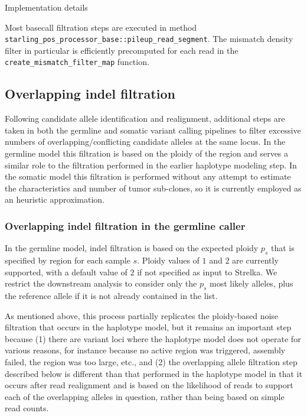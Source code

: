 \documentclass{article}
\newenvironment{raggedParagraph}[1]
{
    \begin{paragraph} {#1}
        \raggedright
    }
    {
    \end{paragraph}
}
\begin{document}
\begin{raggedParagraph}{Implementation details}

Most basecall filtration steps are executed in method \verb|starling_pos_processor_base::pileup_read_segment|. The mismatch density filter in particular is efficiently precomputed for each read in the \verb|create_mismatch_filter_map| function.

\end{raggedParagraph}

\fi %

\subsection{Overlapping indel filtration}

Following candidate allele identification and realignment, additional steps are taken in both the germline and somatic variant calling pipelines to filter excessive numbers of overlapping/conflicting candidate alleles at the same locus. In the germline model this filtration is based on the ploidy of the region and serves a similar role to the filtration performed in the earlier haplotype modeling step. In the somatic model this filtration is performed without any attempt to estimate the characteristics and number of tumor sub-clones, so it is currently employed as an heuristic approximation.

\subsubsection{Overlapping indel filtration in the germline caller}
In the germline model, indel filtration is based on the expected ploidy $p_s$ that is specified by region for each sample $s$. Ploidy values of $1$ and $2$ are currently supported, with a default value of $2$ if not specified as input to Strelka. We restrict the downstream analysis to consider only the $p_s$ most likely alleles, plus the reference allele if it is not already contained in the list.

As mentioned above, this process partially replicates the ploidy-based noise filtration that occurs in the haplotype model, but it remains an important step because (1) there are variant loci where the haplotype model does not operate for various reasons, for instance because no active region was triggered, assembly failed, the region was too large, etc., and (2) the overlapping allele filtration step described below is different than that performed in the haplotype model in that it occurs after read realignment and is based on the likelihood of reads to support each of the overlapping alleles in question, rather than being based on simple read counts.
\end{document}
